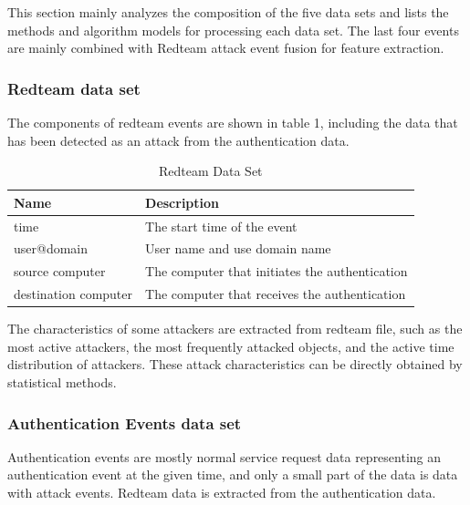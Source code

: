 \documentclass[12pt,journal,draftcls,doublespace, letterpaper,onecolumn]{IEEEtran}
\begin{document}
This section mainly analyzes the composition of the five data sets and lists the methods and algorithm models for processing each data set. The last four events are mainly combined with Redteam attack event fusion for feature extraction.

\subsubsection{Redteam data set}

The components of redteam events are shown in table 1, including the data that has been detected as an attack from the authentication data. 

\begin{table}[h]
	\caption{Redteam Data Set}
	\vspace{1pt}
	\centering
	\begin{tabular}{p{2.5cm}p{5cm}}
		\hline
		Name & Description \\
		\hline
		time  & The start time of the event\\
		user@domain  & User name and use domain name\\ 
		source computer  & The computer that initiates the authentication\\ 
		destination computer  & The computer that receives the authentication\\
		\hline       
	\end{tabular}
	\label{bs2}
\end{table}

The characteristics of some attackers are extracted from redteam file, such as the most active attackers, the most frequently attacked objects, and the active time distribution of attackers. These attack characteristics can be directly obtained by statistical methods.



\subsubsection{Authentication Events data set}

Authentication events are mostly normal service request data representing an authentication event at the given time, and only a small part of the data is data with attack events. Redteam data is extracted from the authentication data. 
 
\end{document}
